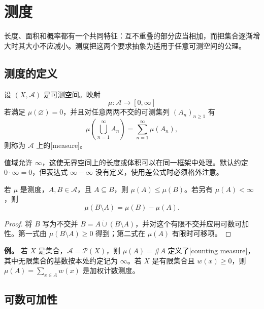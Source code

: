 \section{测度}
\label{b1:sec:0201}

长度、面积和概率都有一个共同特征：互不重叠的部分应当相加，而把集合逐渐增大时其大小不应减小。测度把这两个要求抽象为适用于任意可测空间的公理。

\subsection{测度的定义}
\label{b1:subsec:020101}

\begin{definition}
\label{b1:def:measure}
设 \((X,\mathcal A)\) 是可测空间。映射
\[
\mu:\mathcal A\longrightarrow[0,\infty]
\]
若满足 \(\mu(\varnothing)=0\)，并且对任意两两不交的可测集列 \((A_n)_{n\geq1}\) 有
\[
\mu\left(\bigcup_{n=1}^{\infty}A_n\right)
=\sum_{n=1}^{\infty}\mu(A_n),
\]
则称为 \(\mathcal A\) 上的[measure]。
\end{definition}

值域允许 \(\infty\)，这使无界空间上的长度或体积可以在同一框架中处理。默认约定 \(0\cdot\infty=0\)，但表达式 \(\infty-\infty\) 没有定义，使用差公式时必须格外注意。

\begin{proposition}
\label{b1:prop:measure-monotonicity}
若 \(\mu\) 是测度，\(A,B\in\mathcal A\)，且 \(A\subseteq B\)，则 \(\mu(A)\leq\mu(B)\)。若另有 \(\mu(A)<\infty\)，则
\[
\mu(B\setminus A)=\mu(B)-\mu(A).
\]
\end{proposition}
\begin{proof}
将 \(B\) 写为不交并 \(B=A\mathbin{\dot\cup}(B\setminus A)\)，并对这个有限不交并应用可数可加性。第一式由 \(\mu(B\setminus A)\geq0\) 得到；第二式在 \(\mu(A)\) 有限时可移项。
\end{proof}

\begin{remark}
\label{b1:rem:standard-measures}
\textbf{例。} 若 \(X\) 是集合，\(\mathcal A=\mathcal P(X)\)，则 \(\mu(A)=\#A\) 定义了[counting measure]，其中无限集合的基数按本处约定记为 \(\infty\)。若 \(X\) 是有限集合且 \(w(x)\geq0\)，则 \(\mu(A)=\sum_{x\in A}w(x)\) 是加权计数测度。
\end{remark}

\subsection{可数可加性}
\label{b1:subsec:020102}

